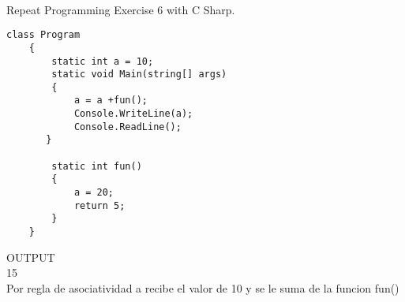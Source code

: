 \documentclass[../main.tex]{subfiles}
\begin{document}
\paragraph{ }
Repeat Programming Exercise 6 with C Sharp.

\begin{lstlisting}[frame=single]  
class Program
    {
        static int a = 10;
        static void Main(string[] args)
        {
            a = a +fun();
            Console.WriteLine(a);
            Console.ReadLine();
       }

        static int fun()
        {
            a = 20;
            return 5;
        }
    }
\end{lstlisting}
OUTPUT\\15\\ 
Por regla de asociatividad a recibe el valor de 10 y se le suma de la funcion fun()


\clearpage
\end{document}
